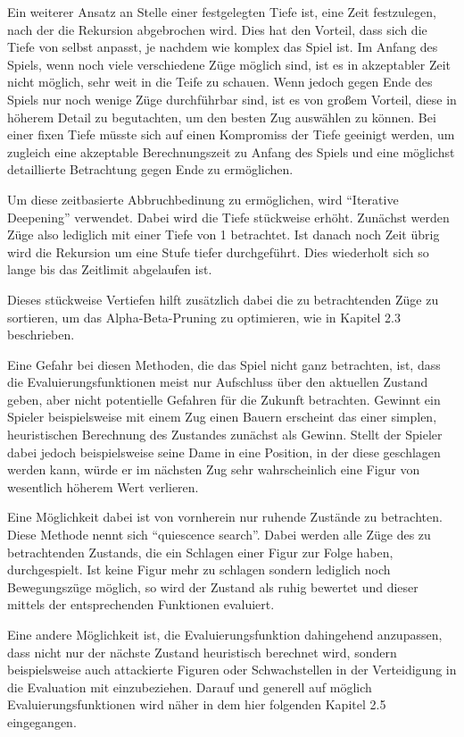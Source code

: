 Ein weiterer Ansatz an Stelle einer festgelegten Tiefe ist, eine Zeit festzulegen, nach der die Rekursion abgebrochen wird. Dies hat den Vorteil, dass sich die Tiefe von selbst anpasst, je nachdem wie komplex das Spiel ist. Im Anfang des Spiels, wenn noch viele verschiedene Züge möglich sind, ist es in akzeptabler Zeit nicht möglich, sehr weit in die Teife zu schauen. Wenn jedoch gegen Ende des Spiels nur noch wenige Züge durchführbar sind, ist es von großem Vorteil, diese in höherem Detail zu begutachten, um den besten Zug auswählen zu können. Bei einer fixen Tiefe müsste sich auf einen Kompromiss der Tiefe geeinigt werden, um zugleich eine akzeptable Berechnungszeit zu Anfang des Spiels und eine möglichst detaillierte Betrachtung gegen Ende zu ermöglichen.

Um diese zeitbasierte Abbruchbedinung zu ermöglichen, wird ``Iterative Deepening'' verwendet. Dabei wird die Tiefe stückweise erhöht. Zunächst werden Züge also lediglich mit einer Tiefe von 1 betrachtet. Ist danach noch Zeit übrig wird die Rekursion um eine Stufe tiefer durchgeführt. Dies wiederholt sich so lange bis das Zeitlimit abgelaufen ist.


Dieses stückweise Vertiefen hilft zusätzlich dabei die zu betrachtenden Züge zu sortieren, um das Alpha-Beta-Pruning zu optimieren, wie in Kapitel 2.3 beschrieben.
 
Eine Gefahr bei diesen Methoden, die das Spiel nicht ganz betrachten, ist, dass die Evaluierungsfunktionen meist nur Aufschluss über den aktuellen Zustand geben, aber nicht potentielle Gefahren für die Zukunft betrachten. Gewinnt ein Spieler beispielsweise mit einem Zug einen Bauern erscheint das einer simplen, heuristischen Berechnung des Zustandes zunächst als Gewinn. Stellt der Spieler dabei jedoch beispielsweise seine Dame in eine Position, in der diese geschlagen werden kann, würde er im nächsten Zug sehr wahrscheinlich eine Figur von wesentlich höherem Wert verlieren.
 
Eine Möglichkeit dabei ist von vornherein nur ruhende Zustände zu betrachten. Diese Methode nennt sich ``quiescence search''. Dabei werden alle Züge des zu betrachtenden Zustands, die ein Schlagen einer Figur zur Folge haben, durchgespielt. Ist keine Figur mehr zu schlagen sondern lediglich noch Bewegungszüge möglich, so wird der Zustand als ruhig bewertet und dieser mittels der entsprechenden Funktionen evaluiert.


Eine andere Möglichkeit ist, die Evaluierungsfunktion dahingehend anzupassen, dass nicht nur der nächste Zustand heuristisch berechnet wird, sondern beispielsweise auch attackierte Figuren oder Schwachstellen in der Verteidigung in die Evaluation mit einzubeziehen. Darauf und generell auf möglich Evaluierungsfunktionen wird näher in dem hier folgenden Kapitel 2.5 eingegangen.
 
